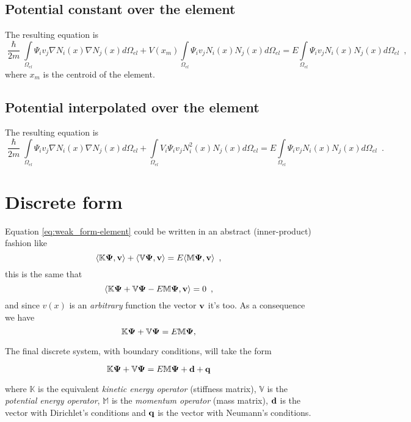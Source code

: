 \documentclass[12pt,letterpaper,final]{article}
\begin{document}
\subsection{Potential constant over the element}
The resulting equation is
\begin{equation}
\frac{\hslash}{2m}\int\limits_{\Omega_{el}} \Psi_i v_j \nabla N_i(x) \nabla N_j(x) d\Omega_{el} +
V(x_m)\int\limits_{\Omega_{el}} \Psi_i v_j N_i(x) N_j(x) d\Omega_{el} =
E\int\limits_{\Omega_{el}} \Psi_i v_j N_i(x) N_j(x)d\Omega_{el} \enspace ,
\label{eq:weak_form-constant}
\end{equation}
where $x_m$ is the centroid of the element.

\subsection{Potential interpolated over the element}
The resulting equation is
\begin{equation}
\frac{\hslash}{2m}\int\limits_{\Omega_{el}} \Psi_i v_j \nabla N_i(x) \nabla N_j(x) d\Omega_{el} +
\int\limits_{\Omega_{el}} V_i \Psi_i v_j N_i^2(x) N_j(x) d\Omega_{el} =
E\int\limits_{\Omega_{el}} \Psi_i v_j N_i(x) N_j(x)d\Omega_{el} \enspace .
\label{eq:weak_form-varriable}
\end{equation}

\section{Discrete form}
Equation \eqref{eq:weak_form-element} could be written in an abstract (inner-product) fashion
like
\[ \langle\mathbb{K}\bold{\Psi},\bold{v}\rangle + \langle\mathbb{V}\bold{\Psi},\bold{v}\rangle
=E\langle\mathbb{M}\bold{\Psi},\bold{v}\rangle \enspace ,  \]
this is the same that
\[ \langle \mathbb{K}\bold{\Psi} + \mathbb{V}\bold{\Psi} - E\mathbb{M}\bold{\Psi} ,
\bold{v} \rangle = 0 \enspace ,\]
and since $v(x)$ is an \emph{arbitrary} function the vector $\bold{v}$ it's too. As a
consequence we have
\[\mathbb{K}\bold{\Psi} + \mathbb{V}\bold{\Psi} = E\mathbb{M}\bold{\Psi} ,\]

The final discrete system, with boundary conditions, will take the form

\[\mathbb{K}\bold{\Psi} + \mathbb{V}\bold{\Psi} = E \mathbb{M}\bold{\Psi} + \bold{d}+ \bold{q}\]

where $\mathbb{K}$ is the equivalent \emph{kinetic energy operator} (stiffness matrix), $\mathbb{V}$ is the \emph{potential energy operator}, $\mathbb{M}$ is the \emph{momentum operator} (mass matrix), $\bold{d}$ is the vector with Dirichlet's conditions and $\bold{q}$ is the vector with Neumann's conditions.
\end{document}
